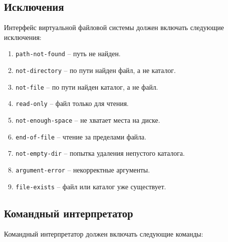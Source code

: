 \subsection{Исключения}

Интерфейс виртуальной файловой системы должен включать следующие исключения:

\begin{enumerate}
\item \texttt{path-not-found} -- путь не найден.
\item \texttt{not-directory} -- по пути найден файл, а не каталог.
\item \texttt{not-file} -- по пути найден каталог, а не файл.
\item \texttt{read-only} -- файл только для чтения.
\item \texttt{not-enough-space} -- не хватает места на диске.
\item \texttt{end-of-file} -- чтение за пределами файла.
\item \texttt{not-empty-dir} -- попытка удаления непустого каталога.
\item \texttt{argument-error} -- некорректные аргументы.
\item \texttt{file-exists} -- файл или каталог уже существует.
\end{enumerate}

\subsection{Командный интерпретатор}

Командный интерпретатор должен включать следующие команды:

